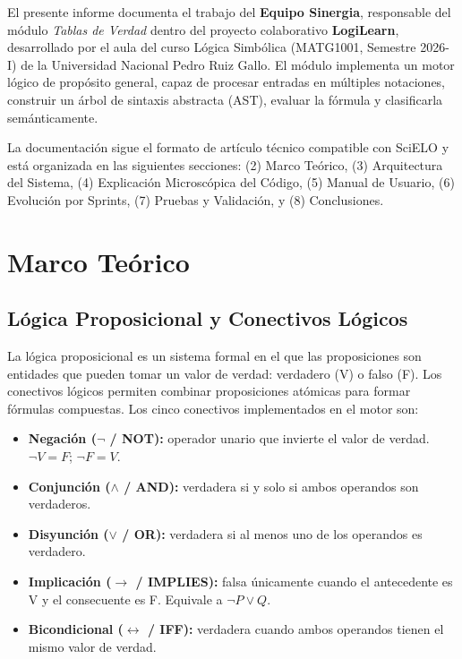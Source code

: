 \documentclass[11pt,a4paper]{article}
\begin{document}
El presente informe documenta el trabajo del \textbf{Equipo Sinergia}, responsable del módulo \textit{Tablas de Verdad} dentro del proyecto colaborativo \textbf{LogiLearn}, desarrollado por el aula del curso Lógica Simbólica (MATG1001, Semestre 2026-I) de la Universidad Nacional Pedro Ruiz Gallo. El módulo implementa un motor lógico de propósito general, capaz de procesar entradas en múltiples notaciones, construir un árbol de sintaxis abstracta (AST), evaluar la fórmula y clasificarla semánticamente.

La documentación sigue el formato de artículo técnico compatible con SciELO y está organizada en las siguientes secciones: (2) Marco Teórico, (3) Arquitectura del Sistema, (4) Explicación Microscópica del Código, (5) Manual de Usuario, (6) Evolución por Sprints, (7) Pruebas y Validación, y (8) Conclusiones.

\section{Marco Teórico}

\subsection{Lógica Proposicional y Conectivos Lógicos}
La lógica proposicional es un sistema formal en el que las proposiciones son entidades que pueden tomar un valor de verdad: verdadero (V) o falso (F). Los conectivos lógicos permiten combinar proposiciones atómicas para formar fórmulas compuestas. Los cinco conectivos implementados en el motor son:
\begin{itemize}[leftmargin=*]
  \item \textbf{Negación ($\neg$ / NOT):} operador unario que invierte el valor de verdad. $\neg V = F$; $\neg F = V$.
  \item \textbf{Conjunción ($\land$ / AND):} verdadera si y solo si ambos operandos son verdaderos.
  \item \textbf{Disyunción ($\lor$ / OR):} verdadera si al menos uno de los operandos es verdadero.
  \item \textbf{Implicación ($\to$ / IMPLIES):} falsa únicamente cuando el antecedente es V y el consecuente es F. Equivale a $\neg P \lor Q$.
  \item \textbf{Bicondicional ($\leftrightarrow$ / IFF):} verdadera cuando ambos operandos tienen el mismo valor de verdad.
\end{itemize}
\end{document}
